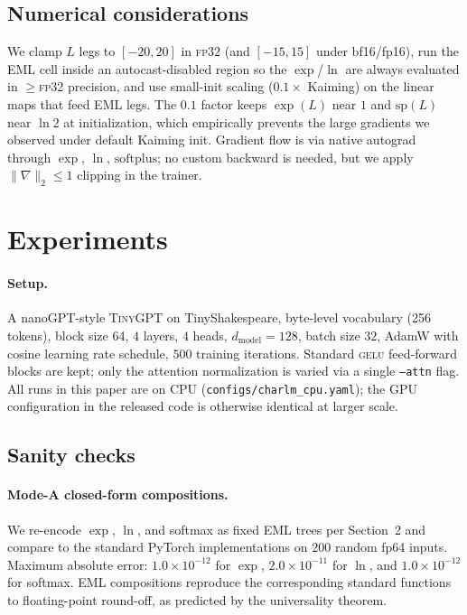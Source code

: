 \documentclass{article}
\begin{document}
\subsection{Numerical considerations}
We clamp $L$ legs to $[-20, 20]$ in \textsc{fp32} (and $[-15, 15]$ under
bf16/fp16), run the EML cell inside an autocast-disabled region so the
$\exp$/$\ln$ are always evaluated in $\geq$\textsc{fp32} precision, and
use small-init scaling ($0.1\times$ Kaiming) on the linear maps that feed
EML legs. The $0.1$ factor keeps $\exp(L)$ near $1$ and $\mathrm{sp}(L)$
near $\ln 2$ at initialization, which empirically prevents the large
gradients we observed under default Kaiming init. Gradient flow is via
native autograd through $\exp$, $\ln$, $\mathrm{softplus}$; no custom
backward is needed, but we apply $\|\nabla\|_2 \leq 1$ clipping in the
trainer.

\section{Experiments}

\paragraph{Setup.} A nanoGPT-style \textsc{TinyGPT} on TinyShakespeare,
byte-level vocabulary (256 tokens), block size 64, $4$ layers, $4$ heads,
$d_{\text{model}} = 128$, batch size $32$, AdamW with cosine learning rate
schedule, $500$ training iterations. Standard \textsc{gelu} feed-forward
blocks are kept; only the attention normalization is varied via a single
\texttt{--attn} flag. All runs in this paper are on CPU
(\texttt{configs/charlm\_cpu.yaml}); the GPU configuration in the released
code is otherwise identical at larger scale.

\subsection{Sanity checks}

\paragraph{Mode-A closed-form compositions.} We re-encode $\exp$, $\ln$,
and softmax as fixed EML trees per Section~2 and compare to the standard
PyTorch implementations on $200$ random fp64 inputs. Maximum absolute
error: $1.0\!\times\!10^{-12}$ for $\exp$, $2.0\!\times\!10^{-11}$ for
$\ln$, and $1.0\!\times\!10^{-12}$ for softmax. EML compositions reproduce
the corresponding standard functions to floating-point round-off, as
predicted by the universality theorem.
\end{document}

